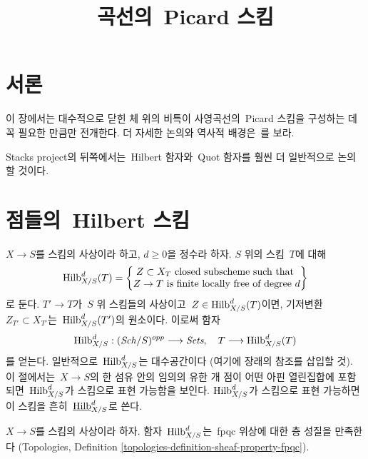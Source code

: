 

%


\title{곡선의\  Picard 스킴}


\maketitle

\label{section-phantom}

\tableofcontents


\section{서론}
\label{section-introduction}

\noindent
이 장에서는 대수적으로 닫힌 체 위의 비특이 사영곡선의\  Picard 스킴을
구성하는 데 꼭 필요한 만큼만 전개한다. 더 자세한 논의와 역사적 배경은\ 
\cite{Kleiman-Picard}를 보라.

\medskip\noindent
Stacks project의 뒤쪽에서는\  Hilbert 함자와\  Quot 함자를 훨씬 더 일반적으로
논의할 것이다.


\section{점들의\  Hilbert 스킴}
\label{section-hilbert-scheme-points}

\noindent
$X \to S$를 스킴의 사상이라 하고, $d \geq 0$을 정수라 하자.
$S$ 위의 스킴\  $T$에 대해
$$
\mathrm{Hilb}^d_{X/S}(T) =
\left\{
\begin{matrix}
Z \subset X_T\text{ closed subscheme such that }\\
Z \to T\text{ is finite locally free of degree }d
\end{matrix}
\right\}
$$
로 둔다. $T' \to T$가\  $S$ 위 스킴들의 사상이고\ 
$Z \in \mathrm{Hilb}^d_{X/S}(T)$이면, 기저변환\ 
$Z_{T'} \subset X_{T'}$는\  $\mathrm{Hilb}^d_{X/S}(T')$의 원소이다.
이로써 함자
$$
\mathrm{Hilb}^d_{X/S} :
(\mathit{Sch}/S)^{opp} \longrightarrow \textit{Sets},\quad
T \longrightarrow \mathrm{Hilb}^d_{X/S}(T)
$$
를 얻는다. 일반적으로\  $\mathrm{Hilb}^d_{X/S}$는 대수공간이다
(여기에 장래의 참조를 삽입할 것). 이 절에서는\  $X \to S$의 한 섬유 안의
임의의 유한 개 점이 어떤 아핀 열린집합에 포함되면\ 
$\mathrm{Hilb}^d_{X/S}$가 스킴으로 표현 가능함을 보인다.
$\mathrm{Hilb}^d_{X/S}$가 스킴으로 표현 가능하면 이 스킴을 흔히\ 
$\underline{\mathrm{Hilb}}^d_{X/S}$로 쓴다.

\begin{lemma}
\label{lemma-hilb-d-sheaf}
$X \to S$를 스킴의 사상이라 하자. 함자\  $\mathrm{Hilb}^d_{X/S}$는\ 
fpqc 위상에 대한 층 성질을 만족한다
(Topologies, Definition \ref{topologies-definition-sheaf-property-fpqc}).
\end{lemma}

